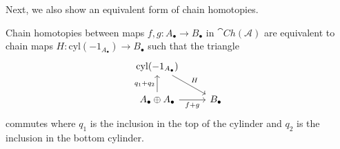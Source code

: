 Next, we also show an equivalent form of chain homotopies.

\begin{lem}[label=lem:cylHomotop]
    Chain homotopies between maps $f,g:A_\bullet\to B_\bullet$ in $\cat{Ch}(\mathcal{A})$ are equivalent to chain maps $H:\text{cyl}(-1_{A_\bullet})\to B_\bullet$ such that the triangle
    \[\begin{tikzcd}
        {\text{cyl}(-1_{A_\bullet})} \\
        {A_\bullet\oplus A_\bullet} & {B_\bullet}
        \arrow["{f+g}"', from=2-1, to=2-2]
        \arrow["H", from=1-1, to=2-2]
        \arrow["{q_1+q_2}", from=2-1, to=1-1]
    \end{tikzcd}\]
    commutes where $q_1$ is the inclusion in the top of the cylinder and $q_2$ is the inclusion in the bottom cylinder.
\end{lem}
